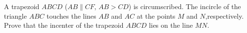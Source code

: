 A trapezoid $ABCD$ ($AB \parallel CF$, $AB > CD$) is circumscribed. The incircle of the triangle $ABC$ touches the lines $AB$ and $AC$ at the points $M$ and $N$,respectively. Prove that the incenter of the trapezoid $ABCD$ lies on the line $MN$.
